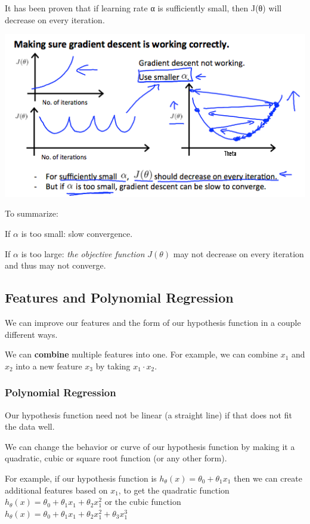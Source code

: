 \documentclass[
]{article}
\begin{document}
It has been proven that if learning rate α is sufficiently small, then
J(θ) will decrease on every iteration.

\includegraphics{Gradient Descent in Practice II - Learning Rate graph2.png}

To summarize:

If \(\alpha\) is too small: slow convergence.

If \(\alpha\) is too large: \emph{the objective function} \(J(\theta)\)
may not decrease on every iteration and thus may not converge.

\hypertarget{features-and-polynomial-regression}{%
\subsection{Features and Polynomial
Regression}\label{features-and-polynomial-regression}}

We can improve our features and the form of our hypothesis function in a
couple different ways.

We can \textbf{combine} multiple features into one. For example, we can
combine \(x_1\) and \(x_2\) into a new feature \(x_3\) by taking
\(x_1⋅x_2\).

\hypertarget{polynomial-regression}{%
\subsubsection{Polynomial Regression}\label{polynomial-regression}}

Our hypothesis function need not be linear (a straight line) if that
does not fit the data well.

We can change the behavior or curve of our hypothesis function by making
it a quadratic, cubic or square root function (or any other form).

For example, if our hypothesis function is
\(h_\theta(x) = \theta_0 + \theta_1 x_1\) then we can create additional
features based on \(x_1\), to get the quadratic function
\(h_\theta(x) = \theta_0 + \theta_1 x_1 + \theta_2 x_1^2\) or the cubic
function
\(h_\theta(x) = \theta_0 + \theta_1 x_1 + \theta_2 x_1^2 + \theta_3 x_1^3\)
\end{document}
